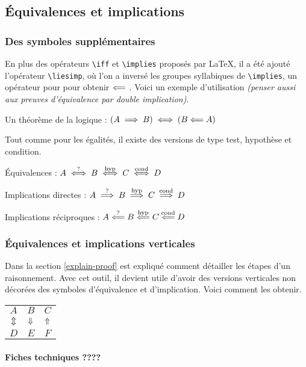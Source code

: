 \documentclass[12pt,a4paper]{article}
\begin{document}

\subsection{Équivalences et implications}

\subsubsection{Des symboles supplémentaires}

En plus des opérateurs \verb+\iff+ et \verb+\implies+ proposés par \LaTeX{}, il a été ajouté l'opérateur \verb+\liesimp+, où l'on a inversé les groupes syllabiques de \verb+\implies+, un opérateur pour pour obtenir $\mathrel{\Longleftarrow}$ . Voici un exemple d'utilisation \emph{(penser aussi aux preuves d'équivalence par double implication)}.

\begin{tcblisting}{}
Un théorème de la logique : $(A \implies B) \iff (B \liesimp A)$
\end{tcblisting}


Tout comme pour les égalités, il existe des versions de type test, hypothèse et condition.

\begin{tcblisting}{}
Équivalences : $A \ifftest B \iffhyp C \iffcond D$

Implications directes : $A \impliestest B \implieshyp C \impliescond D$

Implications réciproques : $A \liesimptest B \liesimphyp C \liesimpcond D$
\end{tcblisting}


\subsubsection{Équivalences et implications verticales}

Dans la section \ref{explain-proof} est expliqué comment détailler les étapes d'un raisonnement. Avec cet outil, il devient utile d'avoir des versions verticales non décorées des symboles d'équivalence et d'implication. Voici comment les obtenir.

\begin{tcblisting}{}
\begin{tabular}{ccc}
    $A$       &   $B$           &   $C$         \\
    $\viff$   &   $\vimplies$   &   $\vliesimp$ \\
    $D$       &   $E$           &   $F$
\end{tabular}
\end{tcblisting}



\paragraph{Fiches techniques ????}
\end{document}
